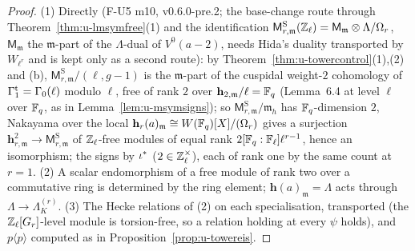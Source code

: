 \documentclass[11pt]{article}
\newcommand{\Iw}{\Lambda}                         %
\newcommand{\hcusp}{\mathbf{h}}                   %
\newcommand{\cusp}{\mathrm{S}}
\newcommand{\Zl}{\Z_\ell}
\newcommand{\GaT}[1]{\Ga^{\mathrm t}_{#1}}            %
\newcommand{\Om}[1]{\Omega_{#1}}                      %
\newcommand{\IwT}[2]{\Iw^{(#2)}_{#1}}                 %
\begin{document}
\begin{proof}
(1) Directly (F-U5 m10, v0.6.0-pre.2; the base-change route through Theorem~\ref{thm:u-lmsymfree}(1) and the identification $\mathsf M^{\cusp}_{r,\mathfrak m}(\Zl)=\mathsf M_{\mathfrak m}\otimes\Iw/\Om r$,
$\mathsf M_{\mathfrak m}$ the $\mathfrak m$-part of the $\Iw$-dual of $V^{0}(a-2)$, needs Hida's duality transported by $W_{\ell^{r}}$ and is kept only as a second route): by Theorem~\ref{thm:u-towercontrol}(1),(2)
and (b), $\mathsf M^{\cusp}_{r,\mathfrak m}/(\ell,g-1)$ is the $\mathfrak m$-part of the cuspidal weight-$2$ cohomology of $\GaT1=\Ga_0(\ell)$ modulo $\ell$, free of rank $2$ over
$\hcusp_{2,\mathfrak m}/\ell=\F_q$ (Lemma~6.4 at level $\ell$ over $\mathbb{F}_q$, as in Lemma~\ref{lem:u-msymsigns}); so $\mathsf M^{\cusp}_{r,\mathfrak m}/\mathfrak m_{h}$ has $\mathbb{F}_q$-dimension $2$, Nakayama over the local
$\hcusp_r(a)_{\mathfrak m}\cong W(\F_q)[X]/(\Om r)$ gives a surjection $\hcusp_{r,\mathfrak m}^{2}\to\mathsf M^{\cusp}_{r,\mathfrak m}$ of $\Zl$-free modules of equal rank $2[\mathbb{F}_q:\mathbb{F}_\ell]\ell^{r-1}$, hence an isomorphism; the
signs by $\iota^{\ast}$ ($2\in\Zl^{\times}$), each of rank one by the same count at $r=1$. (2) A scalar endomorphism of a free module of
rank two over a commutative ring is determined by the ring element; $\hcusp(a)_{\mathfrak m}=\Iw$ acts through $\Iw\to\IwT Kr$. (3) The Hecke relations of (2) on each specialisation,
transported (the $\Zl[G_r]$-level module is torsion-free, so a relation holding at every $\psi$ holds), and $p\langle p\rangle$ computed as in Proposition~\ref{prop:u-towereis}.
\end{proof}
\end{document}
